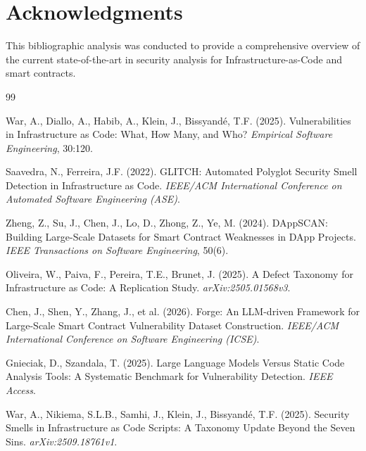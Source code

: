 \documentclass[11pt,a4paper]{article}
\begin{document}
\section*{Acknowledgments}

This bibliographic analysis was conducted to provide a comprehensive overview of the current state-of-the-art in security analysis for Infrastructure-as-Code and smart contracts.

\begin{thebibliography}{99}

War, A., Diallo, A., Habib, A., Klein, J., Bissyandé, T.F. (2025). Vulnerabilities in Infrastructure as Code: What, How Many, and Who? \textit{Empirical Software Engineering}, 30:120.

Saavedra, N., Ferreira, J.F. (2022). GLITCH: Automated Polyglot Security Smell Detection in Infrastructure as Code. \textit{IEEE/ACM International Conference on Automated Software Engineering (ASE)}.

Zheng, Z., Su, J., Chen, J., Lo, D., Zhong, Z., Ye, M. (2024). DAppSCAN: Building Large-Scale Datasets for Smart Contract Weaknesses in DApp Projects. \textit{IEEE Transactions on Software Engineering}, 50(6).

Oliveira, W., Paiva, F., Pereira, T.E., Brunet, J. (2025). A Defect Taxonomy for Infrastructure as Code: A Replication Study. \textit{arXiv:2505.01568v3}.

Chen, J., Shen, Y., Zhang, J., et al. (2026). Forge: An LLM-driven Framework for Large-Scale Smart Contract Vulnerability Dataset Construction. \textit{IEEE/ACM International Conference on Software Engineering (ICSE)}.

Gnieciak, D., Szandala, T. (2025). Large Language Models Versus Static Code Analysis Tools: A Systematic Benchmark for Vulnerability Detection. \textit{IEEE Access}.

War, A., Nikiema, S.L.B., Samhi, J., Klein, J., Bissyandé, T.F. (2025). Security Smells in Infrastructure as Code Scripts: A Taxonomy Update Beyond the Seven Sins. \textit{arXiv:2509.18761v1}.


\end{thebibliography}
\end{document}
